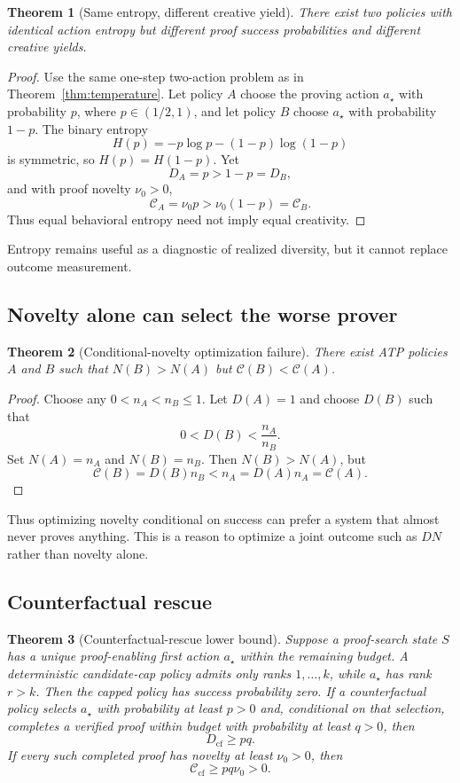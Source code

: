 \documentclass[11pt]{article}
\theoremstyle{datatheorem}
\newtheorem{theorem}{Theorem}[section]
\theoremstyle{definition}
\newcommand{\cY}{\mathcal{C}}
\begin{document}
\begin{theorem}[Same entropy, different creative yield]\label{thm:entropy}
There exist two policies with identical action entropy but different proof success probabilities and different creative yields.
\end{theorem}

\begin{proof}
Use the same one-step two-action problem as in Theorem~\ref{thm:temperature}. Let policy $A$ choose the proving action $a_\star$ with probability $p$, where $p\in(1/2,1)$, and let policy $B$ choose $a_\star$ with probability $1-p$. The binary entropy
\[
H(p)=-p\log p-(1-p)\log(1-p)
\]
is symmetric, so $H(p)=H(1-p)$. Yet
\[
D_A=p>1-p=D_B,
\]
and with proof novelty $\nu_0>0$,
\[
\cY_A=\nu_0p>\nu_0(1-p)=\cY_B.
\]
Thus equal behavioral entropy need not imply equal creativity.
\end{proof}

Entropy remains useful as a diagnostic of realized diversity, but it cannot replace outcome measurement.

\subsection{Novelty alone can select the worse prover}

\begin{theorem}[Conditional-novelty optimization failure]\label{thm:noveltytrap}
There exist ATP policies $A$ and $B$ such that $N(B)>N(A)$ but $\cY(B)<\cY(A)$.
\end{theorem}

\begin{proof}
Choose any $0<n_A<n_B\le 1$. Let $D(A)=1$ and choose $D(B)$ such that
\[
0<D(B)<\frac{n_A}{n_B}.
\]
Set $N(A)=n_A$ and $N(B)=n_B$. Then $N(B)>N(A)$, but
\[
\cY(B)=D(B)n_B<n_A=D(A)n_A=\cY(A).
\]
\end{proof}

Thus optimizing novelty conditional on success can prefer a system that almost never proves anything. This is a reason to optimize a joint outcome such as $DN$ rather than novelty alone.

\subsection{Counterfactual rescue}

\begin{theorem}[Counterfactual-rescue lower bound]\label{thm:rescue}
Suppose a proof-search state $S$ has a unique proof-enabling first action $a_\star$ within the remaining budget. A deterministic candidate-cap policy admits only ranks $1,\dots,k$, while $a_\star$ has rank $r>k$. Then the capped policy has success probability zero. If a counterfactual policy selects $a_\star$ with probability at least $p>0$ and, conditional on that selection, completes a verified proof within budget with probability at least $q>0$, then
\[
D_{\mathrm{cf}}\ge pq.
\]
If every such completed proof has novelty at least $\nu_0>0$, then
\[
\cY_{\mathrm{cf}}\ge pq\nu_0>0.
\]
\end{theorem}
\end{document}
